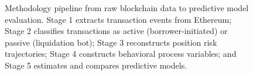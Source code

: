 \begin{figure}[t]
\caption{Methodology pipeline from raw blockchain data to predictive model evaluation. Stage 1 extracts transaction events from Ethereum; Stage 2 classifies transactions as active (borrower-initiated) or passive (liquidation bot); Stage 3 reconstructs position risk trajectories; Stage 4 constructs behavioral process variables; and Stage 5 estimates and compares predictive models.}
\label{fig:methodology}
\end{figure}


